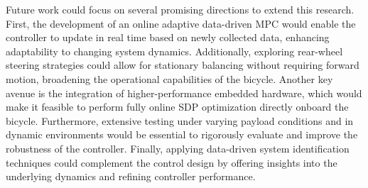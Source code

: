 Future work could focus on several promising directions to extend this research. First, the development of an online adaptive data-driven MPC would enable the controller to update in real time based on newly collected data, enhancing adaptability to changing system dynamics. Additionally, exploring rear-wheel steering strategies could allow for stationary balancing without requiring forward motion, broadening the operational capabilities of the bicycle. Another key avenue is the integration of higher-performance embedded hardware, which would make it feasible to perform fully online SDP optimization directly onboard the bicycle. Furthermore, extensive testing under varying payload conditions and in dynamic environments would be essential to rigorously evaluate and improve the robustness of the controller. Finally, applying data-driven system identification techniques could complement the control design by offering insights into the underlying dynamics and refining controller performance.

